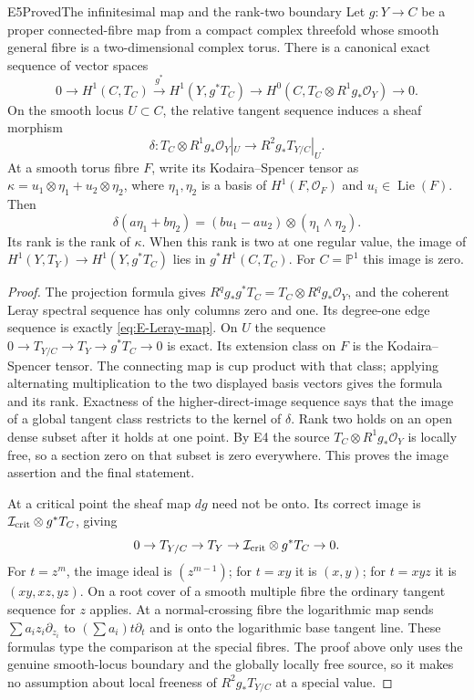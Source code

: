 \begin{statement}{E5}{Proved}{The infinitesimal map and the rank-two boundary}
Let $g:Y\to C$ be a proper connected-fibre map from a compact complex
threefold whose smooth general fibre is a two-dimensional complex
torus. There is a canonical exact sequence of vector spaces
\begin{equation}\label{eq:E-Leray-map}
0\to H^1(C,T_C)\xrightarrow{g^*}H^1(Y,g^*T_C)
 \to H^0(C,T_C\otimes R^1g_*\mathcal O_Y)\to0.
\end{equation}
On the smooth locus $U\subset C$, the relative tangent sequence
induces a sheaf morphism
\[
 \delta:T_C\otimes R^1g_*\mathcal O_Y|_U
                  \longrightarrow R^2g_*T_{Y/C}|_U.
\]
At a smooth torus fibre $F$, write its Kodaira--Spencer tensor as
$\kappa=u_1\otimes\eta_1+u_2\otimes\eta_2$, where
$\eta_1,\eta_2$ is a basis of $H^1(F,\mathcal O_F)$ and
$u_i\in\operatorname{Lie}(F)$. Then
\[
 \delta(a\eta_1+b\eta_2)
   =(bu_1-au_2)\otimes(\eta_1\wedge\eta_2).
\]
Its rank is the rank of $\kappa$. When this rank is two at one
regular value, the image of $H^1(Y,T_Y)\to H^1(Y,g^*T_C)$ lies
in $g^*H^1(C,T_C)$. For $C=\mathbb P^1$ this image is zero.
\end{statement}
\begin{proof}
The projection formula gives
$R^qg_*g^*T_C=T_C\otimes R^qg_*\mathcal O_Y$, and the coherent
Leray spectral sequence has only columns zero and one. Its
degree-one edge sequence is exactly \eqref{eq:E-Leray-map}.
On $U$ the sequence
$0\to T_{Y/C}\to T_Y\to g^*T_C\to0$ is exact. Its extension
class on $F$ is the Kodaira--Spencer tensor. The connecting map is
cup product with that class; applying alternating multiplication to
the two displayed basis vectors gives the formula and its rank.
Exactness of the higher-direct-image sequence says that the image
of a global tangent class restricts to the kernel of $\delta$.
Rank two holds on an open dense subset after it holds at one point.
By E4 the source $T_C\otimes R^1g_*\mathcal O_Y$ is locally free,
so a section zero on that subset is zero everywhere. This proves
the image assertion and the final statement.

At a critical point the sheaf map $dg$ need not be onto. Its correct
image is $\mathcal I_{\rm crit}\otimes g^*T_C$, giving
\[
0\to T_{Y/C}\to T_Y\to
 \mathcal I_{\rm crit}\otimes g^*T_C\to0.
\]
For $t=z^m$, the image ideal is $(z^{m-1})$; for $t=xy$ it is
$(x,y)$; for $t=xyz$ it is $(xy,xz,yz)$. On a root cover of a
smooth multiple fibre the ordinary tangent sequence for $z$ applies.
At a normal-crossing fibre the logarithmic map sends
$\sum a_i z_i\partial_{z_i}$ to
$(\sum a_i)t\partial_t$ and is onto the logarithmic base tangent
line. These formulas type the comparison at the special fibres.
The proof above only uses the genuine smooth-locus boundary and
the globally locally free source, so it makes no assumption about
local freeness of $R^2g_*T_{Y/C}$ at a special value.
\end{proof}


